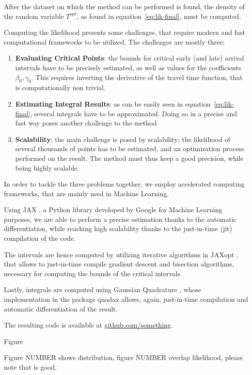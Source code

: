 After the dataset on which the method can be performed is found,
the density of the random variable \(T^{opt}\),
as found in equation~\eqref{eq:lik-final},
must be computed.

Computing the likelihood presents some challenges,
that require modern and fast computational frameworks to be utilized.
The challenges are mostly three:
\begin{enumerate}
\item \textbf{Evaluating Critical Points}:
  the bounds for critical early (and late) arrival intervals have to be precisely estimated,
  as well as values for the coefficients \(\beta_0, \gamma_0\).
  This requires inverting the derivative of the travel time function,
  that is computationally non trivial.
\item \textbf{Estimating Integral Results}:
  as can be easily seen in equation~\eqref{eq:lik-final},
  several integrals have to be approximated.
  Doing so in a precise and fast way poses another challenge to the method
\item \textbf{Scalability}:
  the main challenge is posed by scalability;
  the likelihood of several thousands of points has to be estimated,
  and an optimization process performed on the result.
  The method must thus keep a good precision,
  while being highly scalable.
\end{enumerate}

In order to tackle the three problems together,
we employ accelerated computing frameworks, that are mainly used in Machine Learning.

Using JAX \citep{jax}, a Python library developed by Google for Machine Learning purposes,
we are able to perform a precise estimation thanks to the automatic differentiation,
while reaching high scalability thanks to the just-in-time (jit) compilation of the code.

The intervals are hence computed by utilizing iterative algorithms in JAXopt \citep{jaxopt},
that allows to just-in-time compile gradient descent and bisection algorithms,
necessary for computing the bounds of the critical intervals.

Lastly, integrals are computed using Gaussian Quadrature \citep{gauss_quad},
whose implementation in the package quadax allows, again,
just-in-time compilation and automatic differentiation of the result.

The resulting code is available at \url{github.com/something}.


Figure

Figure NUMBER shows distribution,
figure NUMBER overlap likelihood,
please note that is good.

